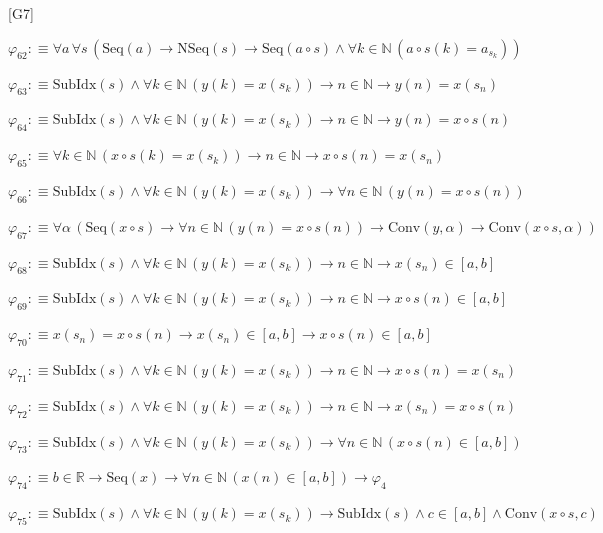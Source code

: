 \begin{fullproof}{[G7]}
\begin{abbrevlist}
\item $\varphi_{62} :\equiv \forall a\,\forall s\,(\mathrm{Seq}(a) \to \mathrm{NSeq}(s) \to \mathrm{Seq}(a \circ s) \land \forall k \in \mathbb{N}\,(a \circ s(k) = a_{s_{k}}))$
\item $\varphi_{63} :\equiv \mathrm{SubIdx}(s) \land \forall k \in \mathbb{N}\,(y(k) = x(s_{k})) \to n \in \mathbb{N} \to y(n) = x(s_{n})$
\item $\varphi_{64} :\equiv \mathrm{SubIdx}(s) \land \forall k \in \mathbb{N}\,(y(k) = x(s_{k})) \to n \in \mathbb{N} \to y(n) = x \circ s(n)$
\item $\varphi_{65} :\equiv \forall k \in \mathbb{N}\,(x \circ s(k) = x(s_{k})) \to n \in \mathbb{N} \to x \circ s(n) = x(s_{n})$
\item $\varphi_{66} :\equiv \mathrm{SubIdx}(s) \land \forall k \in \mathbb{N}\,(y(k) = x(s_{k})) \to \forall n \in \mathbb{N}\,(y(n) = x \circ s(n))$
\item $\varphi_{67} :\equiv \forall \alpha\,(\mathrm{Seq}(x \circ s) \to \forall n \in \mathbb{N}\,(y(n) = x \circ s(n)) \to \mathrm{Conv}(y,\alpha) \to \mathrm{Conv}(x \circ s,\alpha))$
\item $\varphi_{68} :\equiv \mathrm{SubIdx}(s) \land \forall k \in \mathbb{N}\,(y(k) = x(s_{k})) \to n \in \mathbb{N} \to x(s_{n}) \in [a,b]$
\item $\varphi_{69} :\equiv \mathrm{SubIdx}(s) \land \forall k \in \mathbb{N}\,(y(k) = x(s_{k})) \to n \in \mathbb{N} \to x \circ s(n) \in [a,b]$
\item $\varphi_{70} :\equiv x(s_{n}) = x \circ s(n) \to x(s_{n}) \in [a,b] \to x \circ s(n) \in [a,b]$
\item $\varphi_{71} :\equiv \mathrm{SubIdx}(s) \land \forall k \in \mathbb{N}\,(y(k) = x(s_{k})) \to n \in \mathbb{N} \to x \circ s(n) = x(s_{n})$
\item $\varphi_{72} :\equiv \mathrm{SubIdx}(s) \land \forall k \in \mathbb{N}\,(y(k) = x(s_{k})) \to n \in \mathbb{N} \to x(s_{n}) = x \circ s(n)$
\item $\varphi_{73} :\equiv \mathrm{SubIdx}(s) \land \forall k \in \mathbb{N}\,(y(k) = x(s_{k})) \to \forall n \in \mathbb{N}\,(x \circ s(n) \in [a,b])$
\item $\varphi_{74} :\equiv b \in \mathbb{R} \to \mathrm{Seq}(x) \to \forall n \in \mathbb{N}\,(x(n) \in [a,b]) \to \varphi_{4}$
\item $\varphi_{75} :\equiv \mathrm{SubIdx}(s) \land \forall k \in \mathbb{N}\,(y(k) = x(s_{k})) \to \mathrm{SubIdx}(s) \land c \in [a,b] \land \mathrm{Conv}(x \circ s,c)$

\end{abbrevlist}
\end{fullproof}
